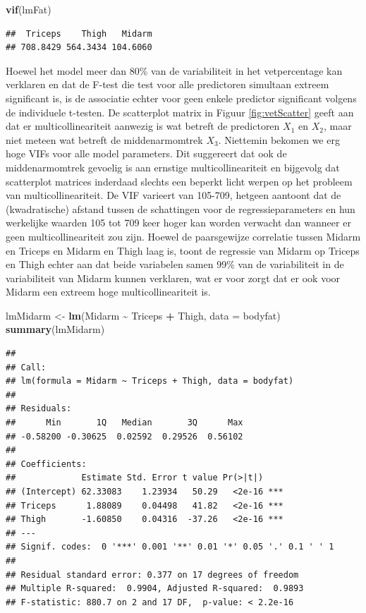 \documentclass[
  12pt,dutch]{book}
\newenvironment{Shaded}{\begin{snugshade}}{\end{snugshade}}
\newcommand{\AttributeTok}[1]{\textcolor[rgb]{0.13,0.29,0.53}{#1}}
\newcommand{\FunctionTok}[1]{\textcolor[rgb]{0.13,0.29,0.53}{\textbf{#1}}}
\newcommand{\NormalTok}[1]{#1}
\newcommand{\OtherTok}[1]{\textcolor[rgb]{0.56,0.35,0.01}{#1}}
\newcommand{\SpecialCharTok}[1]{\textcolor[rgb]{0.81,0.36,0.00}{\textbf{#1}}}
\theoremstyle{definition}
\theoremstyle{definition}
\theoremstyle{definition}
\theoremstyle{definition}
\theoremstyle{remark}
\begin{document}
\begin{Shaded}
\begin{Highlighting}[]
\FunctionTok{vif}\NormalTok{(lmFat)}
\end{Highlighting}
\end{Shaded}

\begin{verbatim}
##  Triceps    Thigh   Midarm 
## 708.8429 564.3434 104.6060
\end{verbatim}

Hoewel het model meer dan 80\% van de variabiliteit in het vetpercentage kan verklaren en dat de F-test die test voor alle predictoren simultaan extreem significant is, is de associatie echter voor geen enkele predictor significant volgens de individuele t-testen.
De scatterplot matrix in Figuur \ref{fig:vetScatter} geeft aan dat er multicollineariteit aanwezig is wat betreft de predictoren \(X_1\) en \(X_2\), maar niet meteen wat betreft de middenarmomtrek \(X_3\). Niettemin bekomen we erg hoge VIFs voor alle model parameters.
Dit suggereert dat ook de middenarmomtrek gevoelig is aan ernstige multicollineariteit en bijgevolg dat scatterplot matrices inderdaad slechts een beperkt licht werpen op het probleem van multicollineariteit.
De VIF varieert van 105-709, hetgeen aantoont dat de (kwadratische) afstand tussen de schattingen voor de regressieparameters en hun werkelijke waarden 105 tot 709 keer hoger kan worden verwacht dan wanneer er geen multicollineariteit zou zijn.
Hoewel de paarsgewijze correlatie tussen Midarm en Triceps en Midarm en Thigh laag is, toont de regressie van Midarm op Triceps en Thigh echter aan dat beide variabelen samen 99\% van de variabiliteit in de variabiliteit van Midarm kunnen verklaren, wat er voor zorgt dat er ook voor Midarm een extreem hoge multicollineariteit is.

\begin{Shaded}
\begin{Highlighting}[]
\NormalTok{lmMidarm }\OtherTok{\textless{}{-}} \FunctionTok{lm}\NormalTok{(Midarm }\SpecialCharTok{\textasciitilde{}}\NormalTok{ Triceps }\SpecialCharTok{+}\NormalTok{ Thigh, }\AttributeTok{data =}\NormalTok{ bodyfat)}
\FunctionTok{summary}\NormalTok{(lmMidarm)}
\end{Highlighting}
\end{Shaded}

\begin{verbatim}
## 
## Call:
## lm(formula = Midarm ~ Triceps + Thigh, data = bodyfat)
## 
## Residuals:
##      Min       1Q   Median       3Q      Max 
## -0.58200 -0.30625  0.02592  0.29526  0.56102 
## 
## Coefficients:
##             Estimate Std. Error t value Pr(>|t|)    
## (Intercept) 62.33083    1.23934   50.29   <2e-16 ***
## Triceps      1.88089    0.04498   41.82   <2e-16 ***
## Thigh       -1.60850    0.04316  -37.26   <2e-16 ***
## ---
## Signif. codes:  0 '***' 0.001 '**' 0.01 '*' 0.05 '.' 0.1 ' ' 1
## 
## Residual standard error: 0.377 on 17 degrees of freedom
## Multiple R-squared:  0.9904, Adjusted R-squared:  0.9893 
## F-statistic: 880.7 on 2 and 17 DF,  p-value: < 2.2e-16
\end{verbatim}
\end{document}

